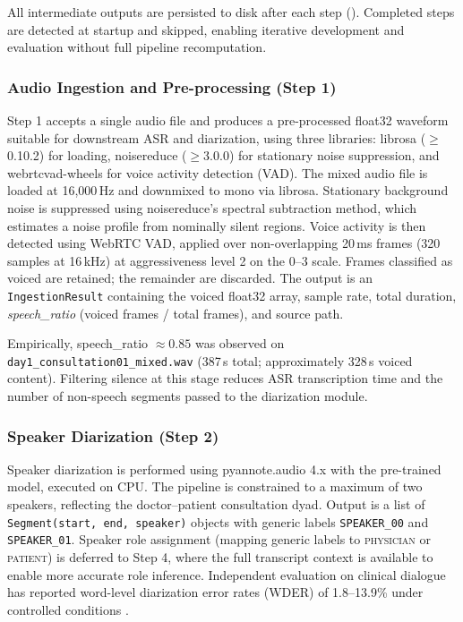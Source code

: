 All intermediate outputs are persisted to disk after each step (). Completed steps are detected at startup and skipped, enabling iterative development and evaluation without full pipeline recomputation.

\subsubsection{Audio Ingestion and Pre-processing (Step 1)}

Step 1 accepts a single audio file and produces a pre-processed float32 waveform suitable for downstream ASR and diarization, using three libraries: librosa ($\geq$0.10.2) for loading, noisereduce ($\geq$3.0.0) for stationary noise suppression, and webrtcvad-wheels for voice activity detection (VAD). The mixed audio file is loaded at 16,000\,Hz and downmixed to mono via librosa. Stationary background noise is suppressed using noisereduce's spectral subtraction method, which estimates a noise profile from nominally silent regions. Voice activity is then detected using WebRTC VAD, applied over non-overlapping 20\,ms frames (320 samples at 16\,kHz) at aggressiveness level 2 on the 0--3 scale. Frames classified as voiced are retained; the remainder are discarded. The output is an \texttt{IngestionResult} containing the voiced float32 array, sample rate, total duration, \textit{speech\_ratio} (voiced frames / total frames), and source path.

Empirically, speech\_ratio $\approx 0.85$ was observed on \texttt{day1\_consultation01\_mixed.wav} (387\,s total; approximately 328\,s voiced content). Filtering silence at this stage reduces ASR transcription time and the number of non-speech segments passed to the diarization module.

\subsubsection{Speaker Diarization (Step 2)}

Speaker diarization is performed using pyannote.audio 4.x \cite{tran2022asr} with the  pre-trained model, executed on CPU. The pipeline is constrained to a maximum of two speakers, reflecting the doctor–patient consultation dyad. Output is a list of \texttt{Segment(start, end, speaker)} objects with generic labels \texttt{SPEAKER\_00} and \texttt{SPEAKER\_01}. Speaker role assignment (mapping generic labels to \textsc{physician} or \textsc{patient}) is deferred to Step 4, where the full transcript context is available to enable more accurate role inference. Independent evaluation on clinical dialogue has reported word-level diarization error rates (WDER) of 1.8–13.9\% under controlled conditions \cite{tran2022asr}.

